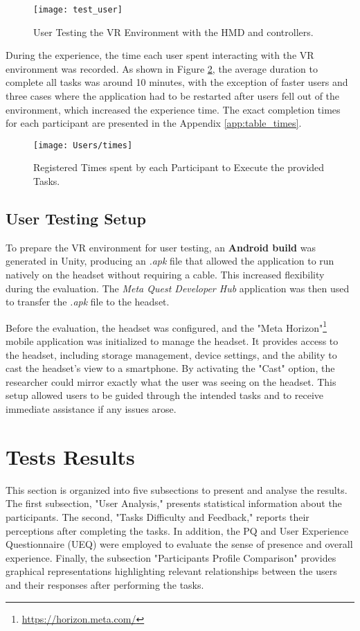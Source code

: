\begin{figure}[h!]
    \centering
    \texttt{[image: test\_user]}
    \caption{User Testing the \gls{VR} Environment with the \gls{HMD} and controllers.} 
    \label{fig:user}
\end{figure}

During the experience, the time each user spent interacting with the \gls{VR} environment was recorded.
As shown in Figure \ref{fig:times}, the average duration to complete all tasks was around 10 minutes, with the exception of faster users and three cases where the application had to be restarted after users fell out of the environment, which increased the experience time.
The exact completion times for each participant are presented in the Appendix \ref{app:table_times}.

\begin{figure}[h!]
    \centering
    \texttt{[image: Users/times]}
    \caption{Registered Times spent by each Participant to Execute the provided Tasks.} 
    \label{fig:times}
\end{figure}

\subsection{User Testing Setup}
\label{sec:setup}
To prepare the \gls{VR} environment for user testing, an \textbf{Android build} was generated in Unity, producing an \emph{.apk} file that allowed the application to run natively on the headset without requiring a cable. 
This increased flexibility during the evaluation. 
The \emph{Meta Quest Developer Hub} application was then used to transfer the \emph{.apk} file to the headset.

Before the evaluation, the headset was configured, and the "Meta Horizon"\footnote{\url{https://horizon.meta.com/}} mobile application was initialized to manage the headset. 
It provides access to the headset, including storage management, device settings, and the ability to cast the headset's view to a smartphone.
By activating the "Cast" option, the researcher could mirror exactly what the user was seeing on the headset.
This setup allowed users to be guided through the intended tasks and to receive immediate assistance if any issues arose.

\section{Tests Results}
\label{sec:results}
This section is organized into five subsections to present and analyse the results. 
The first subsection, "User Analysis," presents statistical information about the participants. 
The second, "Tasks Difficulty and Feedback," reports their perceptions after completing the tasks. 
In addition, the \gls{PQ} and User Experience Questionnaire (\gls{UEQ}) were employed to evaluate the sense of presence and overall experience. 
Finally, the subsection "Participants Profile Comparison" provides graphical representations highlighting relevant relationships between the users and their responses after performing the tasks.

